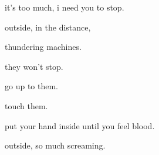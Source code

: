 \documentclass[extrafontsizes, 48pt]{memoir}
\newcommand\blankpage{%
    \null
    \thispagestyle{empty}%
    \addtocounter{page}{-1}%
    \newpage}
\begin{document}
	\begin{minipage}{.6\textwidth}
	it's too much, i need you to stop.
	\afterpage{\blankpage}
	\end{minipage}
	\newpage

	\begin{minipage}{.6\textwidth}
	outside, in the distance,
	\end{minipage}
	\newpage

	\begin{minipage}{.6\textwidth}
	thundering machines.
	\end{minipage}
	\newpage

	\begin{minipage}{.6\textwidth}
	they won't stop.
	\afterpage{\blankpage}
	\end{minipage}
	\newpage

	\begin{minipage}{.6\textwidth}
	go up to them.
	\end{minipage}
	\newpage

	\begin{minipage}{.6\textwidth}
	touch them.
	\end{minipage}
	\newpage

	\begin{minipage}{.6\textwidth}
	put your hand inside until you feel blood.
	\afterpage{\blankpage}
	\end{minipage}
	\newpage

	\begin{minipage}{.6\textwidth}
	outside, so much screaming.
	\end{minipage}
	\newpage
\end{document}

